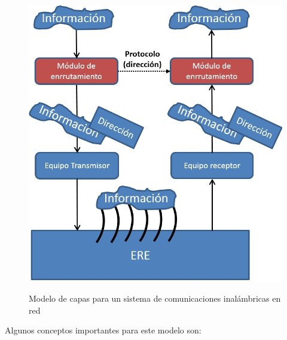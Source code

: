 \begin{figure}[h!]
	\captionsetup{justification = raggedright, singlelinecheck = false}
	\caption{Modelo de capas para un sistema de comunicaciones inalámbricas en red} 
	\centering
	\includegraphics[scale=0.6]{Imagenes/CapasV1}
	\label{fig:CapasV1}
\end{figure}

Algunos conceptos importantes para este modelo son:   

